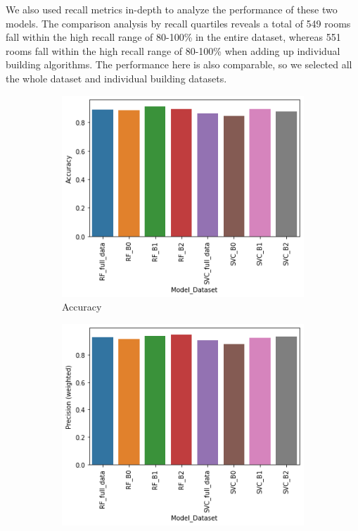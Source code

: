 \documentclass[a4paper,singleside,12pt]{report} %
\begin{document}
			We also used recall metrics in-depth to analyze the performance of these two models. 
			The comparison analysis by recall quartiles reveals a total of 549 rooms fall within the high recall range of 80-100\% in the entire dataset, whereas 551 rooms fall within the high recall range of 80-100\% when adding up individual building algorithms. 
			The performance here is also comparable, so we selected all the whole dataset and individual building datasets. 
			
			\begin{figure}[!htb]
			  \centering
			  \begin{subfigure}[b]{0.48\linewidth}
			    \includegraphics[width=\linewidth]{./figures/Accuracyfinal_results.png}
			     \caption{Accuracy}
			  \end{subfigure}
			  \begin{subfigure}[b]{0.48\linewidth}
			    \includegraphics[width=\linewidth]{./figures/Precision (weighted)final_results.png}

\end{subfigure}
\end{figure}
\end{document}
